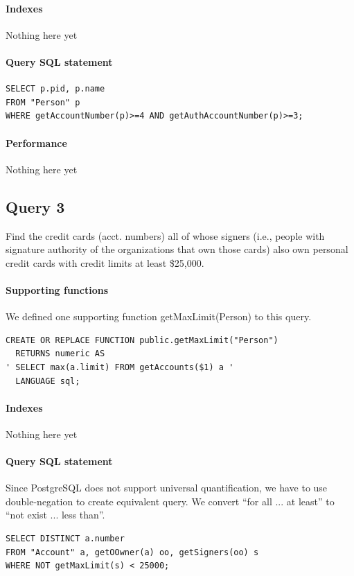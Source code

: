 \documentclass[11pt]{article}
\begin{document}
\paragraph{Indexes} Nothing here yet

\paragraph{Query SQL statement}
\begin{verbatim}
SELECT p.pid, p.name
FROM "Person" p
WHERE getAccountNumber(p)>=4 AND getAuthAccountNumber(p)>=3;
\end{verbatim}

\paragraph{Performance} Nothing here yet

\subsection{Query 3}
Find the credit cards (acct. numbers) all of whose signers (i.e., people with signature authority of the organizations that own those cards) also own personal credit cards with credit limits at least \$25,000.

\paragraph{Supporting functions} We defined one supporting function getMaxLimit(Person) to this query.
\begin{verbatim}
CREATE OR REPLACE FUNCTION public.getMaxLimit("Person")
  RETURNS numeric AS
' SELECT max(a.limit) FROM getAccounts($1) a '
  LANGUAGE sql;
\end{verbatim}

\paragraph{Indexes} Nothing here yet

\paragraph{Query SQL statement} Since PostgreSQL does not support universal quantification, we have to use double-negation to create equivalent query. We convert ``for all ... at least'' to ``not exist ... less than''.
\begin{verbatim}
SELECT DISTINCT a.number
FROM "Account" a, getOOwner(a) oo, getSigners(oo) s
WHERE NOT getMaxLimit(s) < 25000;
\end{verbatim}
\end{document}
